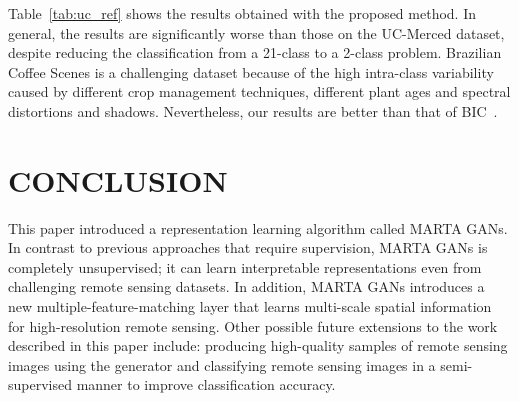 \documentclass[journal]{IEEEtran}
\begin{document}
Table~\ref{tab:uc_ref} shows the results obtained with the proposed method. In general, the results are significantly worse than those on the UC-Merced dataset, despite reducing the classification from a 21-class to a 2-class problem. Brazilian Coffee Scenes is a challenging dataset because of the high intra-class variability caused by different crop management techniques, different plant ages and spectral distortions and shadows. Nevertheless, our results are better than that of BIC~\cite{penatti2015deep}.







\vspace{-2mm}
\section{CONCLUSION}
\label{sec:discussion}
\vspace{-2mm}
This paper introduced a representation learning algorithm called MARTA GANs. In contrast to previous approaches that require supervision, MARTA GANs is completely unsupervised; it can learn interpretable representations even from challenging remote sensing datasets. In addition, MARTA GANs introduces a new multiple-feature-matching layer that learns multi-scale spatial information for high-resolution remote sensing. Other possible future extensions to the work described in this paper include: producing high-quality samples of remote sensing images using the generator and classifying remote sensing images in a semi-supervised manner to improve classification accuracy.














\end{document}
